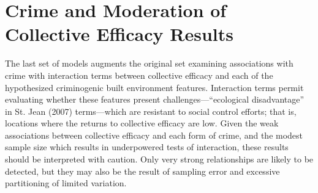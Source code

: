 \documentclass [11pt, proquest] {uwthesis}[2015/03/03]
\begin{document}
\hypertarget{crime-and-moderation-of-collective-efficacy-results}{%
\section{Crime and Moderation of Collective Efficacy Results}\label{crime-and-moderation-of-collective-efficacy-results}}

The last set of models augments the original set examining associations with crime with interaction terms between collective efficacy and each of the hypothesized criminogenic built environment features. Interaction terms permit evaluating whether these features present challenges---``ecological disadvantage'' in St. Jean (2007) terms---which are resistant to social control efforts; that is, locations where the returns to collective efficacy are low. Given the weak associations between collective efficacy and each form of crime, and the modest sample size which results in underpowered tests of interaction, these results should be interpreted with caution. Only very strong relationships are likely to be detected, but they may also be the result of sampling error and excessive partitioning of limited variation.

\providecommand{\docline}[3]{\noalign{\global\setlength{\arrayrulewidth}{#1}}\arrayrulecolor[HTML]{#2}\cline{#3}}

\setlength{\tabcolsep}{4pt}
\end{document}
